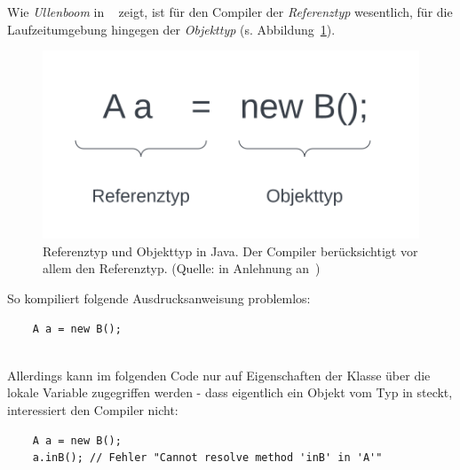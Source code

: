 Wie \textit{Ullenboom} in ~\cite[467 f.]{Ull23} zeigt, ist für den Compiler der \textit{Referenztyp} wesentlich, für die Laufzeitumgebung hingegen der \textit{Objekttyp} (s. Abbildung~\ref{fig:types}).\\

\begin{figure}
    \begin{center}
        \includegraphics[scale=0.5]{chapters/OOP/img/types}
        \caption{Referenztyp und Objekttyp in Java.
        Der Compiler berücksichtigt vor allem den Referenztyp. (Quelle: in Anlehnung an~\cite[467 f., ``Begrifflichkeit``]{Ull23})}
        \label{fig:types}
    \end{center}
\end{figure}

\noindent
So kompiliert folgende Ausdrucksanweisung problemlos:

\begin{verbatim}
    A a = new B();
\end{verbatim}\\

\noindent
Allerdings kann im folgenden Code nur auf Eigenschaften der Klasse  über die lokale Variable  zugegriffen werden - dass eigentlich ein Objekt vom Typ  in  steckt, interessiert den Compiler nicht:\\

\begin{verbatim}
    A a = new B();
    a.inB(); // Fehler "Cannot resolve method 'inB' in 'A'"
\end{verbatim}\\

